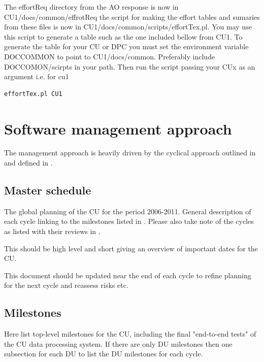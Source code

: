 \documentclass[CUx,lsstdraft,SDP]{lsstdoc}
\begin{document}
The effortReq directory from the AO response is now in CU1/docs/common/effrotReq
the script for making the effort tables and sumaries from these files is now
in CU1/docs/common/scripts/effortTex.pl. You may use this script to generate a
table such as the one included bellow from CU1. To generate the table for your
CU or DPC you must set the environment variable DOCCOMMON to point to
CU1/docs/common. Preferably include DOCCOMON/scirpts in your path. Then run the script
passing your CUx as an argument i.e. for cu1
\begin{verbatim}
effortTex.pl CU1
\end{verbatim}



\section{Software management approach} \label{sect:managemntapp}
The management approach is heavily driven by the cyclical approach outlined
in  and defined in .

\subsection{Master schedule } \label{sect:mastschedule}

The global planning of the CU for the period 2006-2011.
General description of each cycle linking to the  milestones
listed in .  Please also take note of the cycles
as listed with their reviews in .

This should be high level and short giving an overview of important dates for the CU.

This document should be updated near the end of each cycle to
refine planning for the next cycle and reassess risks etc.

\subsection{Milestones}
Here list top-level milestones for the CU, including the final "end-to-end tests" of the CU data processing system. If there are only DU milestones then
one subsection for each DU to list the DU milestones for each cycle.
\end{document}
